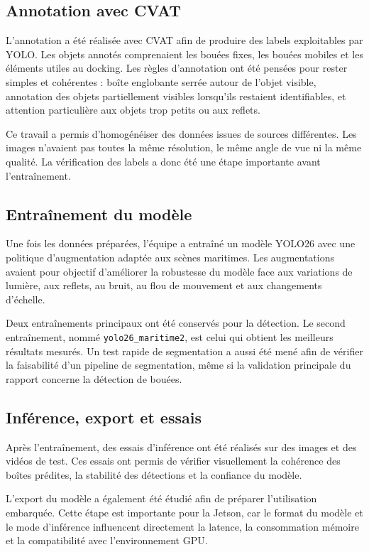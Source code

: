 \documentclass[11pt,letterpaper]{article}
\begin{document}
\subsection{Annotation avec CVAT}

L'annotation a été réalisée avec CVAT afin de produire des labels exploitables par YOLO. Les objets annotés comprenaient les bouées fixes, les bouées mobiles et les éléments utiles au docking. Les règles d'annotation ont été pensées pour rester simples et cohérentes : boîte englobante serrée autour de l'objet visible, annotation des objets partiellement visibles lorsqu'ils restaient identifiables, et attention particulière aux objets trop petits ou aux reflets.

Ce travail a permis d'homogénéiser des données issues de sources différentes. Les images n'avaient pas toutes la même résolution, le même angle de vue ni la même qualité. La vérification des labels a donc été une étape importante avant l'entraînement.

\subsection{Entraînement du modèle}

Une fois les données préparées, l'équipe a entraîné un modèle YOLO26 avec une politique d'augmentation adaptée aux scènes maritimes. Les augmentations avaient pour objectif d'améliorer la robustesse du modèle face aux variations de lumière, aux reflets, au bruit, au flou de mouvement et aux changements d'échelle.

Deux entraînements principaux ont été conservés pour la détection. Le second entraînement, nommé \texttt{yolo26\_maritime2}, est celui qui obtient les meilleurs résultats mesurés. Un test rapide de segmentation a aussi été mené afin de vérifier la faisabilité d'un pipeline de segmentation, même si la validation principale du rapport concerne la détection de bouées.

\subsection{Inférence, export et essais}

Après l'entraînement, des essais d'inférence ont été réalisés sur des images et des vidéos de test. Ces essais ont permis de vérifier visuellement la cohérence des boîtes prédites, la stabilité des détections et la confiance du modèle.

L'export du modèle a également été étudié afin de préparer l'utilisation embarquée. Cette étape est importante pour la Jetson, car le format du modèle et le mode d'inférence influencent directement la latence, la consommation mémoire et la compatibilité avec l'environnement GPU.
\end{document}
